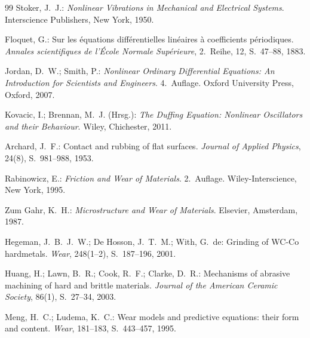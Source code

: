 ﻿\documentclass[a4paper,12pt]{article}
\theoremstyle{definition}
\begin{document}
\begin{thebibliography}{99}
Stoker, J.~J.:
\textit{Nonlinear Vibrations in Mechanical and Electrical Systems}.
Interscience Publishers, New York, 1950.
 
 
Floquet, G.:
Sur les {\'e}quations diff{\'e}rentielles lin{\'e}aires {\`a} coefficients
p{\'e}riodiques.
\textit{Annales scientifiques de l'{\'{E}}cole Normale Sup{\'e}rieure}, 2.~Reihe,
12, S.~47--88, 1883.
 
Jordan, D.~W.; Smith, P.:
\textit{Nonlinear Ordinary Differential Equations: An Introduction for Scientists
and Engineers}.
4.~Auflage. Oxford University Press, Oxford, 2007.
 
Kovacic, I.; Brennan, M.~J. (Hrsg.):
\textit{The Duffing Equation: Nonlinear Oscillators and their Behaviour}.
Wiley, Chichester, 2011.
 
 
Archard, J.~F.:
Contact and rubbing of flat surfaces.
\textit{Journal of Applied Physics}, 24(8), S.~981--988, 1953.
 
Rabinowicz, E.:
\textit{Friction and Wear of Materials}.
2.~Auflage. Wiley-Interscience, New York, 1995.
 
Zum Gahr, K.~H.:
\textit{Microstructure and Wear of Materials}.
Elsevier, Amsterdam, 1987.
 
Hegeman, J.~B.~J.~W.; De Hosson, J.~T.~M.; With, G.~de:
Grinding of WC-Co hardmetals.
\textit{Wear}, 248(1--2), S.~187--196, 2001.
 
Huang, H.; Lawn, B.~R.; Cook, R.~F.; Clarke, D.~R.:
Mechanisms of abrasive machining of hard and brittle materials.
\textit{Journal of the American Ceramic Society}, 86(1), S.~27--34, 2003.
 
Meng, H.~C.; Ludema, K.~C.:
Wear models and predictive equations: their form and content.
\textit{Wear}, 181--183, S.~443--457, 1995.
 
 

\end{thebibliography}
\end{document}
